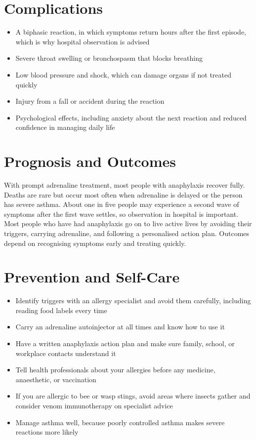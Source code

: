 \section*{Complications}
\begin{itemize}
    \item A biphasic reaction, in which symptoms return hours after the first episode, which is why hospital observation is advised
    \item Severe throat swelling or bronchospasm that blocks breathing
    \item Low blood pressure and shock, which can damage organs if not treated quickly
    \item Injury from a fall or accident during the reaction
    \item Psychological effects, including anxiety about the next reaction and reduced confidence in managing daily life
\end{itemize}

\section*{Prognosis and Outcomes}
With prompt adrenaline treatment, most people with anaphylaxis recover fully. Deaths are rare but occur most often when adrenaline is delayed or the person has severe asthma. About one in five people may experience a second wave of symptoms after the first wave settles, so observation in hospital is important. Most people who have had anaphylaxis go on to live active lives by avoiding their triggers, carrying adrenaline, and following a personalised action plan. Outcomes depend on recognising symptoms early and treating quickly.

\section*{Prevention and Self-Care}
\begin{itemize}
    \item Identify triggers with an allergy specialist and avoid them carefully, including reading food labels every time
    \item Carry an adrenaline autoinjector at all times and know how to use it
    \item Have a written anaphylaxis action plan and make sure family, school, or workplace contacts understand it
    \item Tell health professionals about your allergies before any medicine, anaesthetic, or vaccination
    \item If you are allergic to bee or wasp stings, avoid areas where insects gather and consider venom immunotherapy on specialist advice
    \item Manage asthma well, because poorly controlled asthma makes severe reactions more likely
\end{itemize}

